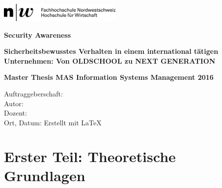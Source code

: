 \documentclass[12pt]{article}
\begin{document}

\begin{titlepage}
\includegraphics[width=0.45\textwidth]{FHNW_HW_10mm.jpg}\par
\vspace{7cm}
{\Huge\bfseries Security Awareness \par}
{\large\bfseries Sicherheitsbewusstes Verhalten in einem international tätigen \\Unternehmen: Von OLDSCHOOL zu NEXT GENERATION  \par}
\vspace{4.5cm}
{\large\bfseries Master Thesis MAS Information Systems Management 2016\par}
\vspace{1.0cm}
\TabPositions{4cm}
{\normalsize Auftraggeberschaft:    \\}
{\normalsize Autor:                  \\}
{\normalsize Dozent:                 \\}
{\normalsize Ort, Datum:            }
\vspace{2.0cm}
\vfill
{\small Erstellt mit \LaTeX}
\end{titlepage}


\setcounter{page}{0}


\newpage



\newpage
\vspace*{10cm}

\setcounter{page}{1}

\setcounter{section}{1}
\setcounter{subsection}{0}
\section*{Erster Teil: Theoretische Grundlagen}
\newpage

\end{document}
